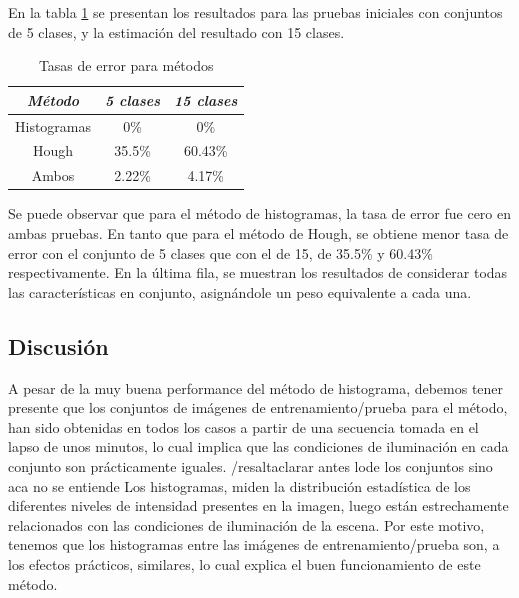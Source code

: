 \documentclass[conference,spanish,a4paper,10pt,oneside,final]{tfmpd}
\begin{document}
En la tabla \ref{tablaerrores} se presentan los resultados para las pruebas
iniciales con conjuntos de 5 clases, y la estimación del resultado con
15 clases. 


\begin{table}
\caption{Tasas de error para métodos}
\begin{center}\begin{tabular}{ccc}
\hline \emph{Método} & \emph{5 clases} & \emph{15 clases}\\ 
\hline Histogramas & 0\% & 0\%\\ 
\hline Hough & 35.5\% & 60.43\%\\ 
\hline Ambos & 2.22\% & 4.17\%\\ 
\hline 
\end{tabular}\end{center}
\label{tablaerrores}
\end{table}

Se puede observar que para el método de histogramas, la tasa de error fue cero
en ambas pruebas. En tanto que para el método de Hough, se obtiene menor tasa de
error con el conjunto de 5 clases que con el de 15, de 35.5\% y 60.43\%
respectivamente. En la última fila, se muestran los resultados de considerar todas
las características en conjunto, asignándole un peso equivalente a cada una. 

%
%
\subsection{Discusión}
A pesar de la muy buena performance del método de histograma, debemos tener
presente que los conjuntos de imágenes de entrenamiento/prueba para el método, 
han sido obtenidas en todos los casos a partir de una secuencia tomada en el 
lapso de unos minutos, lo cual implica que las condiciones de iluminación en
cada conjunto son prácticamente iguales. /resalt{aclarar antes lode los conjuntos sino aca no se entiende}
Los histogramas, miden la distribución estadística de los diferentes niveles
de intensidad presentes en la imagen, luego están estrechamente relacionados
con las condiciones de iluminación de la escena. Por este motivo, tenemos
que los histogramas entre las imágenes de entrenamiento/prueba son, a los
efectos prácticos, similares, lo cual explica el buen funcionamiento de este
método.
\end{document}

